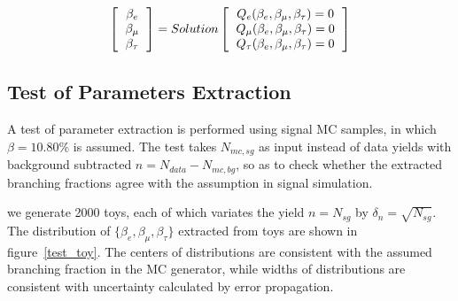 
\begin{equation} 
    \left [
    \begin{tabular}{c}
	    $\beta_{e}$ \\
	    $\beta_{\mu}$ \\
	    $\beta_{\tau}$
    \end{tabular}
    \right ]
    = Solution
    \left [
    \begin{tabular}{c}
	    $Q_e    (\beta_e,\beta_\mu,\beta_\tau) = 0$ \\
	    $Q_\mu  (\beta_e,\beta_\mu,\beta_\tau) = 0$ \\
	    $Q_\tau (\beta_e,\beta_\mu,\beta_\tau) = 0$
    \end{tabular}
\right ]
\end{equation}

\FloatBarrier

\subsection{Test of Parameters Extraction}


A test of parameter extraction is performed using
signal MC samples, in which $\beta=10.80\%$ is assumed. The test
takes $N_{mc,sg}$ as input instead of data yields with background 
subtracted $n=N_{data} - N_{mc,bg}$, 
so as to check whether the extracted branching fractions agree with 
the assumption in signal simulation.

we generate 2000 toys, each of which variates the yield $n=N_{sg}$ by $\delta_n=\sqrt{N_{sg}}$.
The distribution of $\{\beta_{e},\beta_{\mu},\beta_{\tau}\}$ extracted from toys are shown in
figure~\ref{test_toy}. The centers of distributions are consistent with
the assumed branching fraction in the MC generator, while widths of distributions are 
consistent with uncertainty calculated by error propagation.



